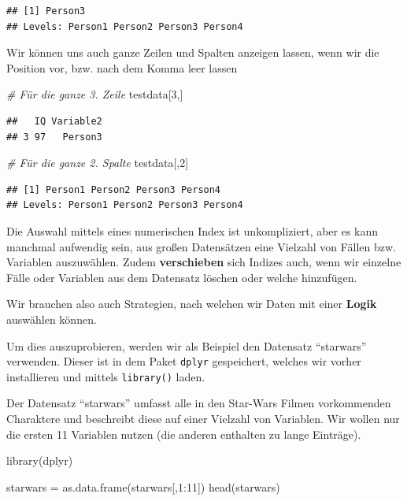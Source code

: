 \documentclass[
]{book}
\newenvironment{Shaded}{\begin{snugshade}}{\end{snugshade}}
\newcommand{\CommentTok}[1]{\textcolor[rgb]{0.56,0.35,0.01}{\textit{#1}}}
\newcommand{\DecValTok}[1]{\textcolor[rgb]{0.00,0.00,0.81}{#1}}
\newcommand{\FunctionTok}[1]{\textcolor[rgb]{0.00,0.00,0.00}{#1}}
\newcommand{\NormalTok}[1]{#1}
\newcommand{\OtherTok}[1]{\textcolor[rgb]{0.56,0.35,0.01}{#1}}
\newcommand{\SpecialCharTok}[1]{\textcolor[rgb]{0.00,0.00,0.00}{#1}}
\begin{document}
\begin{verbatim}
## [1] Person3
## Levels: Person1 Person2 Person3 Person4
\end{verbatim}

Wir können uns auch ganze Zeilen und Spalten anzeigen lassen, wenn wir die Position vor, bzw. nach dem Komma leer lassen

\begin{Shaded}
\begin{Highlighting}[]
\CommentTok{\# Für die ganze 3. Zeile}
\NormalTok{testdata[}\DecValTok{3}\NormalTok{,]}
\end{Highlighting}
\end{Shaded}

\begin{verbatim}
##   IQ Variable2
## 3 97   Person3
\end{verbatim}

\begin{Shaded}
\begin{Highlighting}[]
\CommentTok{\# Für die ganze 2. Spalte}
\NormalTok{testdata[,}\DecValTok{2}\NormalTok{]}
\end{Highlighting}
\end{Shaded}

\begin{verbatim}
## [1] Person1 Person2 Person3 Person4
## Levels: Person1 Person2 Person3 Person4
\end{verbatim}

Die Auswahl mittels eines numerischen Index ist unkompliziert, aber es kann manchmal aufwendig sein, aus großen Datensätzen eine Vielzahl von Fällen bzw. Variablen auszuwählen.
Zudem \textbf{verschieben} sich Indizes auch, wenn wir einzelne Fälle oder Variablen aus dem Datensatz löschen oder welche hinzufügen.

Wir brauchen also auch Strategien, nach welchen wir Daten mit einer \textbf{Logik} auswählen können.

Um dies auszuprobieren, werden wir als Beispiel den Datensatz ``starwars'' verwenden. Dieser ist in dem Paket \texttt{dplyr} gespeichert, welches wir vorher installieren und mittels \texttt{library()} laden.

Der Datensatz ``starwars'' umfasst alle in den Star-Wars Filmen vorkommenden Charaktere und beschreibt diese auf einer Vielzahl von Variablen.
Wir wollen nur die ersten 11 Variablen nutzen (die anderen enthalten zu lange Einträge).

\begin{Shaded}
\begin{Highlighting}[]
\FunctionTok{library}\NormalTok{(dplyr)}

\NormalTok{starwars }\OtherTok{=} \FunctionTok{as.data.frame}\NormalTok{(starwars[,}\DecValTok{1}\SpecialCharTok{:}\DecValTok{11}\NormalTok{])}
\FunctionTok{head}\NormalTok{(starwars)}
\end{Highlighting}
\end{Shaded}
\end{document}
